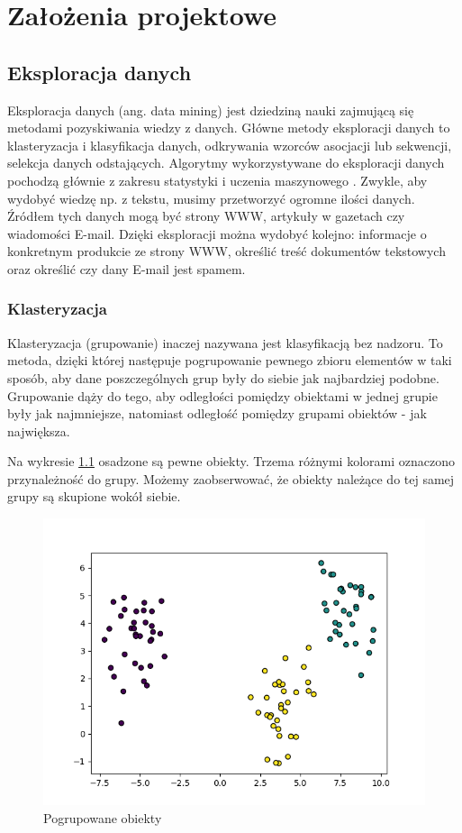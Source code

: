 \chapter{Założenia projektowe}
\section{Eksploracja danych}
Eksploracja danych (ang. data mining) jest dziedziną nauki zajmującą się metodami pozyskiwania wiedzy z danych. Główne metody eksploracji danych to klasteryzacja i klasyfikacja danych, odkrywania wzorców asocjacji lub sekwencji, selekcja danych odstających. Algorytmy wykorzystywane do eksploracji danych pochodzą głównie z zakresu statystyki i uczenia maszynowego \cite{9783319141411}. Zwykle, aby wydobyć wiedzę np. z tekstu, musimy przetworzyć ogromne ilości danych. Źródłem tych danych mogą być strony WWW, artykuły w gazetach czy wiadomości E-mail. Dzięki eksploracji można wydobyć kolejno: informacje o konkretnym produkcie ze strony WWW, określić treść dokumentów tekstowych oraz określić czy dany E-mail jest spamem. 

\subsection{Klasteryzacja}
Klasteryzacja (grupowanie) inaczej nazywana jest klasyfikacją bez nadzoru. To metoda, dzięki której następuje pogrupowanie pewnego zbioru elementów w taki sposób, aby dane poszczególnych grup były do siebie jak najbardziej podobne. Grupowanie dąży do tego, aby odległości pomiędzy obiektami w jednej grupie były jak najmniejsze, natomiast odległość pomiędzy grupami obiektów - jak największa.

Na wykresie \figurename{\ref{fig:threeblobs}} osadzone są pewne obiekty. Trzema różnymi kolorami oznaczono przynależność do grupy. Możemy zaobserwować, że obiekty należące do tej samej grupy są skupione wokół siebie.

\begin{figure}[h!]
    \centering
    \includegraphics[scale=0.5]{Rysunki/Rozdzial2/4.png}
    \caption{Pogrupowane obiekty}
    \label{fig:threeblobs}
\end{figure}

